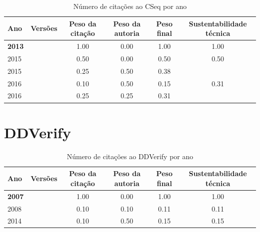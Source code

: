 \begin{table}[H]
\caption{Número de citações ao CSeq por ano}
\centering
\begin{tabular}{| l | c | c | c | c | c |}
  \hline
  Ano & Versões & Peso da citação & Peso da autoria & Peso final & Sustentabilidade técnica \\
  \hline
            {\bf 2013}
          &
          
          &
          1.00
          &
          0.00
          &
          1.00
          &
            {\color{blue} 1.00}
          \\
\hline
            2015
          &
          
          &
          0.50
          &
          0.00
          &
          0.50
          &
            {\color{blue} 0.50}
          \\
            2015
          &
          
          &
          0.25
          &
          0.50
          &
          0.38
          &
          \\
\hline
            2016
          &
          
          &
          0.10
          &
          0.50
          &
          0.15
          &
            {\color{red} 0.31}
          \\
            2016
          &
          
          &
          0.25
          &
          0.25
          &
          0.31
          &
          \\
\hline
\end{tabular}
\end{table}



\section{DDVerify}


\begin{table}[H]
\caption{Número de citações ao DDVerify por ano}
\centering
\begin{tabular}{| l | c | c | c | c | c |}
  \hline
  Ano & Versões & Peso da citação & Peso da autoria & Peso final & Sustentabilidade técnica \\
  \hline
            {\bf 2007}
          &
          
          &
          1.00
          &
          0.00
          &
          1.00
          &
            {\color{blue} 1.00}
          \\
\hline
            2008
          &
          
          &
          0.10
          &
          0.10
          &
          0.11
          &
            {\color{red} 0.11}
          \\
\hline
            2014
          &
          
          &
          0.10
          &
          0.50
          &
          0.15
          &
            {\color{red} 0.15}
          \\
\hline
\end{tabular}
\end{table}



